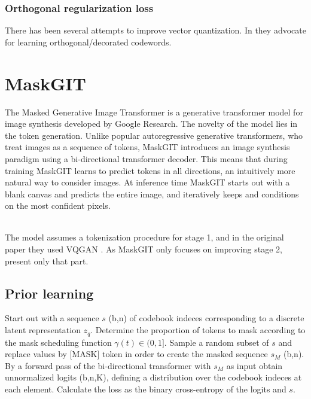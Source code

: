 \documentclass[../../thesis.tex]{subfiles}
\begin{document}
\subsubsection{Orthogonal regularization loss}
There has been several attempts to improve vector quantization. In \cite{shin2023exploration} they advocate for learning orthogonal/decorated codewords. 




\section{MaskGIT}

The Masked Generative Image Transformer is a generative transformer model for image synthesis developed by Google Research. The novelty of the model lies in the token generation. Unlike popular autoregressive generative transformers, who treat images as a sequence of tokens, MaskGIT introduces an image synthesis paradigm using a bi-directional transformer decoder. This means that during training MaskGIT learns to predict tokens in all directions, an intuitively more natural way to consider images. At inference time MaskGIT starts out with a blank canvas and predicts the entire image, and iteratively keeps and conditions on the most confident pixels.\\\\


The model assumes a tokenization procedure for stage 1, and in the original paper they used VQGAN \cite{VQGAN}. As MaskGIT only focuses on improving stage 2, present only that part. 

\subsection{Prior learning}

Start out with a sequence $s$ (b,n) of codebook indeces corresponding to a discrete latent representation $z_q$. Determine the proportion of tokens to mask according to the mask scheduling function $\gamma(t)\in (0,1]$. 
Sample a random subset of $s$ and replace values by [MASK] token in order to create the masked sequence $s_M$ (b,n). By a forward pass of the bi-directional transformer with $s_M$ as input obtain unnormalized logits (b,n,K), defining a distribution over the codebook indeces at each element. Calculate the loss as the binary cross-entropy of the logits and $s$. 
\end{document}
